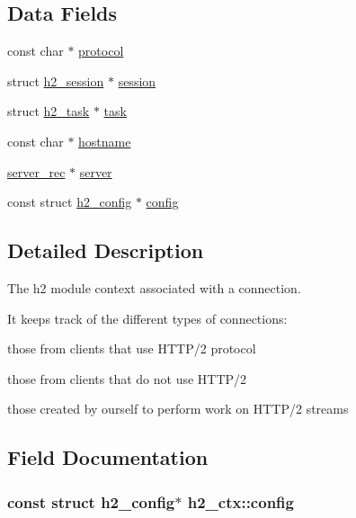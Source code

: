 \subsection*{Data Fields}
\begin{DoxyCompactItemize}
\item 
const char $\ast$ \hyperlink{structh2__ctx_a8c87b6069dd26c5f492101407167140b}{protocol}
\item 
struct \hyperlink{structh2__session}{h2\+\_\+session} $\ast$ \hyperlink{structh2__ctx_ab308cfd9e795488a03d626077b4cdef4}{session}
\item 
struct \hyperlink{structh2__task}{h2\+\_\+task} $\ast$ \hyperlink{structh2__ctx_a3b2dc67bcdbf942f8cd9aca09fa01552}{task}
\item 
const char $\ast$ \hyperlink{structh2__ctx_a02b4b7d911c87acfa6e55c57bc98219e}{hostname}
\item 
\hyperlink{structserver__rec}{server\+\_\+rec} $\ast$ \hyperlink{structh2__ctx_a85fc866b766922f482b061aea2547021}{server}
\item 
const struct \hyperlink{structh2__config}{h2\+\_\+config} $\ast$ \hyperlink{structh2__ctx_aa686a34d1b6a535139253024c0f1530c}{config}
\end{DoxyCompactItemize}


\subsection{Detailed Description}
The h2 module context associated with a connection.

It keeps track of the different types of connections\+:
\begin{DoxyItemize}
\item those from clients that use H\+T\+T\+P/2 protocol
\item those from clients that do not use H\+T\+T\+P/2
\item those created by ourself to perform work on H\+T\+T\+P/2 streams 
\end{DoxyItemize}

\subsection{Field Documentation}
\subsubsection[{\texorpdfstring{config}{config}}]{\setlength{\rightskip}{0pt plus 5cm}const struct {\bf h2\+\_\+config}$\ast$ h2\+\_\+ctx\+::config}\hypertarget{structh2__ctx_aa686a34d1b6a535139253024c0f1530c}{}\label{structh2__ctx_aa686a34d1b6a535139253024c0f1530c}
